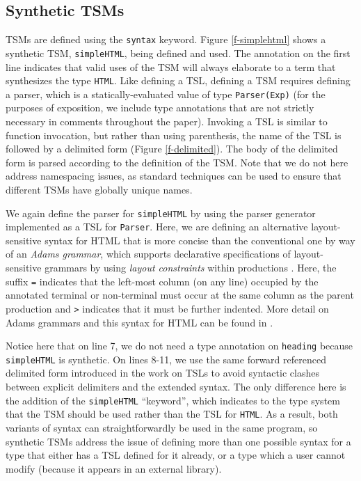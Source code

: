 \documentclass{sig-alternate}
\begin{document}
\subsection{Synthetic TSMs}
TSMs are defined using the \verb|syntax| keyword. Figure \ref{f-simplehtml} shows a synthetic TSM, \verb|simpleHTML|, being defined and used. The annotation on the first line indicates that valid uses of the TSM will always elaborate to a term that synthesizes the type \verb|HTML|. Like defining a TSL, defining a TSM requires defining a parser, which is a statically-evaluated value of type \verb|Parser(Exp)| (for the purposes of exposition, we include type annotations that are not strictly necessary in comments throughout the paper). Invoking a TSL is similar to function invocation, but rather than using parenthesis, the name of the TSL is followed by a delimited form (Figure \ref{f-delimited}). The body of the delimited form is parsed according to the definition of the TSM. Note that we do not here address namespacing issues, as standard techniques can be used to ensure that different TSMs have globally unique names. 

We again define the parser for \verb|simpleHTML| by using the parser generator implemented as a TSL for \verb|Parser|. Here, we are defining an alternative layout-sensitive syntax for HTML that is more concise than the conventional one by way of an \emph{Adams grammar}, which supports declarative specifications of layout-sensitive grammars by using \emph{layout constraints} within productions \cite{Adams:2013:PPI:2429069.2429129}. Here, the suffix \verb|=| indicates that the left-most column (on any line) occupied by the annotated terminal or non-terminal must occur at the same column as the parent production and \verb|>| indicates that it must be further indented. More detail on Adams grammars and this syntax for HTML can be found in \cite{TSLs}. 

Notice here that on line 7, we do not need a type annotation on \verb|heading| because \verb|simpleHTML| is synthetic. On lines 8-11, we use the same forward referenced delimited form introduced in the work on TSLs to avoid syntactic clashes between explicit delimiters and the extended syntax. The only difference here is the addition of the \verb|simpleHTML| ``keyword'', which indicates to the type system that the TSM should be used rather than the TSL for \verb|HTML|. As a result, both variants of syntax can straightforwardly be used in the same program, so synthetic TSMs address the issue of defining more than one possible syntax for a type that either has a TSL defined for it already, or a type which a user cannot modify (because it appears in an external library). 
\end{document}
